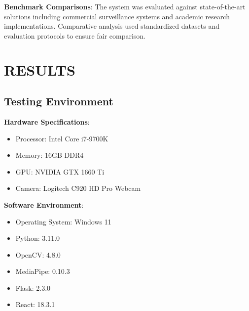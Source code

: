 \documentclass[12pt,a4paper]{article}
\begin{document}
\textbf{Benchmark Comparisons}:
The system was evaluated against state-of-the-art solutions including commercial surveillance systems and academic research implementations. Comparative analysis used standardized datasets and evaluation protocols to ensure fair comparison.

\newpage
\section{RESULTS}

\subsection{Testing Environment}
\textbf{Hardware Specifications}:
\begin{itemize}
    \item Processor: Intel Core i7-9700K
    \item Memory: 16GB DDR4
    \item GPU: NVIDIA GTX 1660 Ti  
    \item Camera: Logitech C920 HD Pro Webcam
\end{itemize}

\textbf{Software Environment}:
\begin{itemize}
    \item Operating System: Windows 11
    \item Python: 3.11.0
    \item OpenCV: 4.8.0
    \item MediaPipe: 0.10.3
    \item Flask: 2.3.0
    \item React: 18.3.1
\end{itemize}
\end{document}
